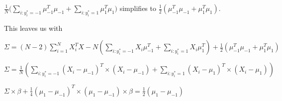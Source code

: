 \begin{center}
$\displaystyle \frac{1}{N}(\sum _{i:y_{i}^{*} =-1} \mu _{-1}^{T} \mu _{-1} +$$\displaystyle \sum _{i:y_{i}^{*} =1} \mu _{1}^{T} \mu _{1})$ simplifies to $\displaystyle \frac{1}{2}\left( \mu _{-1}^{T} \mu _{-1} +\mu _{1}^{T} \mu _{1}\right)$.

This leaves us with

$\displaystyle \Sigma =( N-2)\sum _{i=1}^{N} X_{i}^{T} X-N\left(\sum _{i:y_{i}^{*} =-1} X_{i} \mu _{-1}^{T} +\sum _{i:y_{i}^{*} =1} X_{i} \mu _{1}^{T}\right) +\frac{1}{2}\left( \mu _{-1}^{T} \mu _{-1} +\mu _{1}^{T} \mu _{1}\right)$






$\displaystyle \Sigma =\frac{1}{N}\left(\sum _{i:y_{i}^{*} =-1}( X_{i} -\mu _{-1})^{T} \times ( X_{i} -\mu _{-1}) +\sum _{i:y_{i}^{*} =1}( X_{i} -\mu _{1})^{T} \times ( X_{i} -\mu _{1})\right)$

$\displaystyle \Sigma \times \beta +\frac{1}{4}( \mu _{1} -\mu _{-1})^{T} \times ( \mu _{1} -\mu _{-1}) \times \beta =\frac{1}{2}( \mu _{1} -\mu _{-1})$
\end{center}
